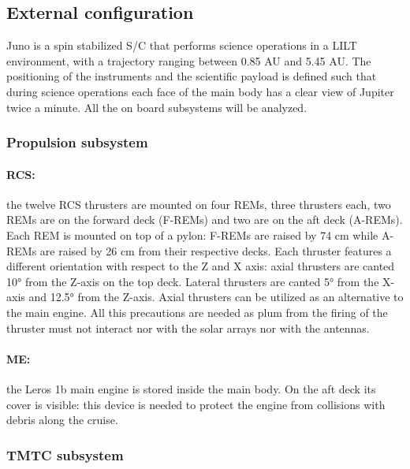 \subsection{External configuration}
\label{subsec:external_config}

Juno is a spin stabilized S/C that performs science operations in a LILT environment, with a trajectory ranging between 0.85 AU and 5.45 AU. The positioning of the instruments and the scientific payload is defined such that during science operations each face of the main body has a clear view of Jupiter twice a minute. All the on board subsystems will be analyzed. 

\subsubsection{Propulsion subsystem}
\label{subsubsec:prop_sub}

\paragraph{RCS:}the twelve RCS thrusters are mounted on four REMs, three thrusters each, two REMs are on the forward deck (F-REMs) and two are on the aft deck (A-REMs). 
Each REM is mounted on top of a pylon: F-REMs are raised by 74 cm while A-REMs are raised by 26 cm from their respective decks. Each thruster features a different orientation with respect to the Z and X axis: axial thrusters are canted 10° from the Z-axis on the top deck. Lateral thrusters are canted 5° from the X-axis and 12.5° from the Z-axis. Axial thrusters can be utilized as an alternative to the main engine.  
\cite{juno_inner}
All this precautions are needed as plum from the firing of the thruster must not interact nor with the solar arrays nor with the antennas.

\vspace{-4mm}

\paragraph{ME:}the Leros 1b main engine is stored inside the main body. On the aft deck its cover is visible: this device is needed to protect the engine from collisions with debris along the cruise. 

\subsubsection{TMTC subsystem}
\label{subsubsec:tmtc_sub}

